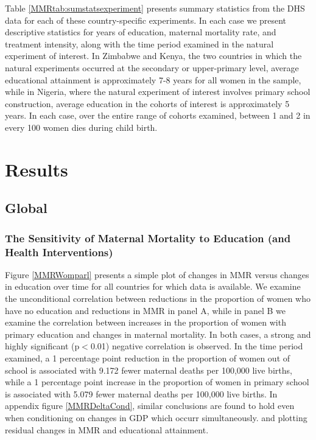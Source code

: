 \documentclass{article}[12pt,subeqn]
\begin{document}
\begin{spacing}{1.4}
Table \ref{MMRtab:sumstatsexperiment} presents summary statistics from the DHS 
data for each of these country-specific experiments.  In each case we present 
descriptive statistics for years of education, maternal mortality rate, and 
treatment intensity, along with the time period examined in the natural 
experiment of interest.  In Zimbabwe and Kenya, the two countries in which the 
natural experiments occurred at the secondary or upper-primary level, average 
educational attainment is approximately 7-8 years for all women in the sample, 
while in Nigeria, where the natural experiment of interest involves primary school 
construction, average education in the cohorts of interest is approximately 5 
years.  In each case, over the entire range of cohorts examined, between 1 and 2 
in every 100 women dies during child birth.


\section{Results}
\subsection{Global}
\subsubsection{The Sensitivity of Maternal Mortality to Education (and Health 
  Interventions)}
Figure \ref{MMRWomparl} presents a simple plot of changes in MMR versus changes
in education over time for all countries for which data is available. We examine
the unconditional correlation between reductions in the proportion of women who
have no education and reductions in MMR in panel A, while in panel B we examine
the correlation between increases in the proportion of women with primary
education and changes in maternal mortality.  In both cases, a strong and highly
significant (p$<$0.01) negative correlation is observed. In the time period
examined, a 1 percentage point reduction in the proportion of women out of school
is associated with 9.172 fewer maternal deaths per 100,000 live births, while a 1
percentage point increase in the proportion of women in primary school is
associated with 5.079 fewer maternal deaths per 100,000 live births.  In
appendix figure \ref{MMRDeltaCond}, similar conclusions are found to hold even
when conditioning on changes in GDP which occurr simultaneously. and plotting
residual changes in MMR and educational attainment.


\end{spacing}
\end{document}
